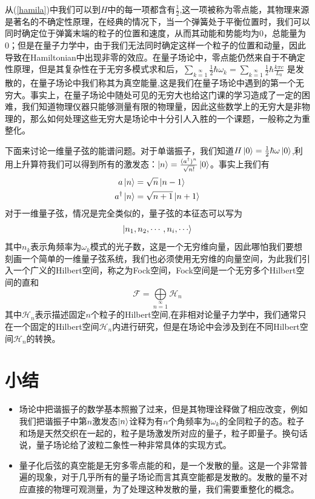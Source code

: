 从(\ref{hamila})中我们可以到$H$中的每一项都含有$\frac{1}{2}$,这一项被称为零点能，其物理来源是著名的不确定性原理，在经典的情况下，当一个弹簧处于平衡位置时，我们可以同时确定位于弹簧末端的粒子的位置和速度，从而其动能和势能均为0，总能量为0；但是在量子力学中，由于我们无法同时确定这样一个粒子的位置和动量，因此导致在Hamiltonian中出现非零的效应。在量子场论中，零点能仍然来自于不确定性原理，但是其复杂性在于无穷多模式求和后，$\sum\limits_{k=1}\limits^{\infty}\frac{1}{2}\hbar \omega_{k}=\sum\limits_{k=1}\limits^{\infty}\frac{1}{2}\hbar \frac{k\pi c}{L_{0}}$ 是发散的，在量子场论中我们称其为真空能量,这是我们在量子场论中遇到的第一个无穷大。事实上，在量子场论中随处可见的无穷大也给这门课的学习造成了一定的困难，我们知道物理仪器只能够测量有限的物理量，因此这些数学上的无穷大是非物理的，那么如何处理这些无穷大是场论中十分引人入胜的一个课题，一般称之为重整化。

下面来讨论一维量子弦的能谱问题。对于单谐振子，我们知道$H\ket{0}=\frac{1}{2}\hbar \omega \ket{0}$,利用上升算符我们可以得到所有的激发态：$\ket{n}=\frac{(a^{\dagger})^{n}}{\sqrt{n!}}\ket{0}$。事实上我们有
\begin{equation}
    \begin{aligned}
    a\ket{n}&=\sqrt{n}\ket{n-1} \\
    a^{\dagger}\ket{n}&=\sqrt{n+1}\ket{n+1}
    \end{aligned}
\end{equation}
对于一维量子弦，情况是完全类似的，量子弦的本征态可以写为
\begin{equation}
    \ket{n_{1},n_{2},\cdots,n_{i},\cdots}
\end{equation}
其中$n_{k}$表示角频率为$\omega_{k}$模式的光子数，这是一个无穷维向量，因此哪怕我们要想刻画一个简单的一维量子弦系统，我们也必须使用无穷维的向量空间，为此我们引入一个广义的Hilbert空间，称之为Fock空间，Fock空间是一个无穷多个Hilbert空间的直和
\begin{equation}
\mathcal{F}=\bigoplus\limits_{n=1}\limits^{\infty}\mathcal{H}_{n}
\end{equation}
其中$\mathcal{H}_{n}$表示描述固定$n$个粒子的Hilbert空间,在非相对论量子力学中，我们通常只在一个固定的Hilbert空间$\mathcal{H}_{n}$内进行研究，但是在场论中会涉及到在不同Hilbert空间$\mathcal{H}_{n}$的转换。

\section{小结}
\begin{itemize}
    \item 场论中把谐振子的数学基本照搬了过来，但是其物理诠释做了相应改变，例如我们把谐振子中第$n$激发态$\ket{n}$诠释为有$n$个角频率为$\omega_{k}$的全同粒子的态。粒子和场是天然交织在一起的，粒子是场激发所对应的量子，粒子即量子。换句话说，量子场论给了波粒二象性一种非常具体的实现方式。
    \item 量子化后弦的真空能是无穷多零点能的和，是一个发散的量。这是一个非常普遍的现象，对于几乎所有的量子场论而言其真空能都是发散的。发散的量不对应直接的物理可观测量，为了处理这种发散的量，我们需要重整化的概念。
    \end{itemize}
    
